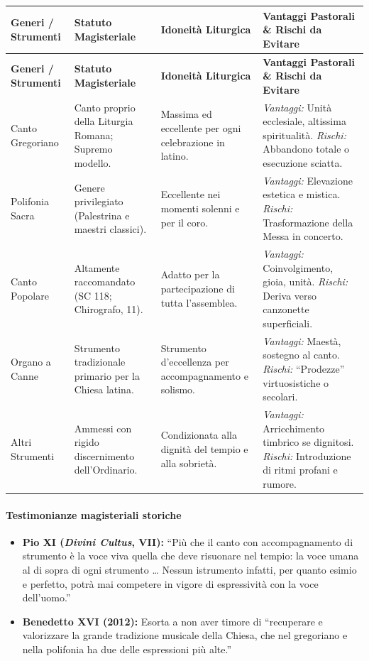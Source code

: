 \documentclass[12pt,a4paper]{article}
\begin{document}
	\begin{longtable}{L{2.5cm}L{3.5cm}L{3cm}L{4.5cm}}
		\toprule
		\textbf{Generi / Strumenti} & \textbf{Statuto Magisteriale} & \textbf{Idoneità Liturgica} & \textbf{Vantaggi Pastorali \& Rischi da Evitare} \\
		\midrule
		\endfirsthead
		\toprule
		\textbf{Generi / Strumenti} & \textbf{Statuto Magisteriale} & \textbf{Idoneità Liturgica} & \textbf{Vantaggi Pastorali \& Rischi da Evitare} \\
		\midrule
		\endhead
		\bottomrule
		\endlastfoot
		Canto Gregoriano & Canto proprio della Liturgia Romana; Supremo modello. & Massima ed eccellente per ogni celebrazione in latino. & \emph{Vantaggi:} Unità ecclesiale, altissima spiritualità. \emph{Rischi:} Abbandono totale o esecuzione sciatta. \\
		Polifonia Sacra & Genere privilegiato (Palestrina e maestri classici). & Eccellente nei momenti solenni e per il coro. & \emph{Vantaggi:} Elevazione estetica e mistica. \emph{Rischi:} Trasformazione della Messa in concerto. \\
		Canto Popolare & Altamente raccomandato (SC 118; Chirografo, 11). & Adatto per la partecipazione di tutta l'assemblea. & \emph{Vantaggi:} Coinvolgimento, gioia, unità. \emph{Rischi:} Deriva verso canzonette superficiali. \\
		Organo a Canne & Strumento tradizionale primario per la Chiesa latina. & Strumento d'eccellenza per accompagnamento e solismo. & \emph{Vantaggi:} Maestà, sostegno al canto. \emph{Rischi:} ``Prodezze'' virtuosistiche o secolari. \\
		Altri Strumenti & Ammessi con rigido discernimento dell'Ordinario. & Condizionata alla dignità del tempio e alla sobrietà. & \emph{Vantaggi:} Arricchimento timbrico se dignitosi. \emph{Rischi:} Introduzione di ritmi profani e rumore. \\
	\end{longtable}
	
	\paragraph{Testimonianze magisteriali storiche}\label{testimonianze-magisteriali-storiche}
	
	\begin{itemize}[leftmargin=*]
		\item \textbf{Pio XI (\emph{Divini Cultus}, VII):} ``Più che il canto con accompagnamento di strumento è la voce viva quella che deve risuonare nel tempio: la voce umana al di sopra di ogni strumento \ldots{} Nessun istrumento infatti, per quanto esimio e perfetto, potrà mai competere in vigore di espressività con la voce dell'uomo.''
		\item \textbf{Benedetto XVI (2012):} Esorta a non aver timore di ``recuperare e valorizzare la grande tradizione musicale della Chiesa, che nel gregoriano e nella polifonia ha due delle espressioni più alte.''
	\end{itemize}
	
\end{document}
